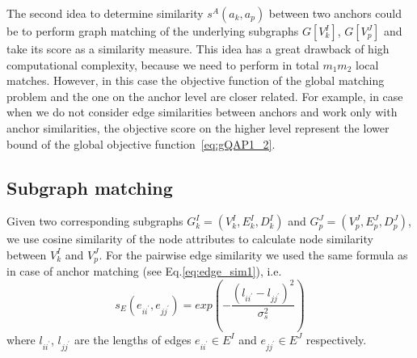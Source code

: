 The second idea to determine similarity $s^A(a_k, a_p)$ between two anchors could be to perform graph matching of the underlying subgraphs $G[V^I_k]$, $G[V^J_p]$ and take its score as a similarity measure. This idea has a great drawback of high computational complexity, because we need to perform in total $m_1m_2$ local matches. However, in this case the objective function of the global matching problem and the one on the anchor level are closer related. For example, in case when we do not consider edge similarities between anchors and work only with anchor similarities, the objective score on the higher level represent the lower bound of the global objective function~\eqref{eq:gQAP1_2}.  %
~
\subsection{Subgraph matching}
Given two corresponding subgraphs $G^I_{k}=(V^I_{k},E^I_{k},D^I_{k})$ and $G^J_{p}=(V^J_{p},E^J_{p},D^J_{p})$, we use cosine similarity of the node attributes to calculate node similarity between $V^I_{k}$ and $V^J_{p}$. For the pairwise edge similarity we used the same formula as in case of anchor matching (see Eq.\eqref{eq:edge_sim1}), i.e.\ 
\begin{equation*}
s_E(e_{ii^\prime}, e_{jj^\prime}) = exp(-\frac{(l_{ii^\prime} - l_{jj^\prime})^2}{\sigma^2_{s}})
\end{equation*}
where $l_{ii^\prime}$, $l_{jj^\prime} $ are the lengths of edges $e_{ii^\prime}\in E^I$ and $e_{jj^\prime}\in E^J$ respectively.

